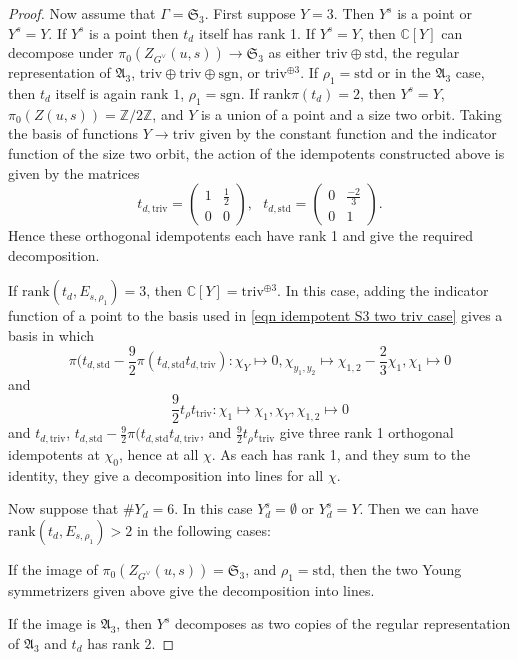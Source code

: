 \documentclass[10pt]{article}
\newcommand{\Z}{\mathbb{Z}}
\newcommand{\C}{\mathbb{C}}
\newcommand{\Sn}{\mathfrak{S}}
\newcommand{\An}{\mathfrak{A}}
\newcommand{\triv}{\mathrm{triv}}
\newcommand{\sgn}{\mathrm{sgn}}
\theoremstyle{definition}
\theoremstyle{remark}
\newcommand{\std}{\mathrm{std}}
\begin{document}
\begin{proof}
Now assume that $\Gamma=\Sn_3$.
First suppose $Y=3$. Then $Y^s$ is a point or $Y^s=Y$. 
If $Y^s$ is a point then $t_d$ itself has rank 1. If $Y^s=Y$, then $\C[Y]$ can decompose under $\pi_0(Z_{G^\vee}(u,s))\to\Sn_3$ as either $\triv\oplus\std$, the regular representation of $\An_3$, $\triv\oplus\triv\oplus\sgn$, or $\triv^{\oplus 3}$. If $\rho_1=\std$ or in the $\An_3$ case, then $t_d$ itself is again rank $1$, $\rho_1=\sgn$. If $\mathrm{rank}\pi(t_d)=2$, then $Y^s=Y$, $\pi_0(Z(u,s))=\Z/2\Z$, and $Y$ is a union of a point and a size two orbit. Taking the basis of functions $Y\to\triv$ given by the constant function and the indicator function of the size two orbit,  the action of the idempotents constructed above is given by the matrices
%
\begin{equation}
\label{eqn idempotent S3 two triv case}
t_{d,\triv}=\begin{pmatrix}
1&\frac{1}{2}\\
0&0
\end{pmatrix},~~~
t_{d,\std}=\begin{pmatrix}
0&\frac{-2}{3}\\
0&1
\end{pmatrix}.
\end{equation}
%
Hence these orthogonal idempotents each have rank 1 and give the required decomposition.

If $\mathrm{rank}(t_d, E_{s,\rho_1})=3$, then $\C[Y]=\triv^{\oplus 3}$. In this case, adding the indicator function of a point to the basis used in \eqref{eqn idempotent S3 two triv case} gives a basis in which
%
\[
\pi(t_{d,\std}-\frac{9}{2}\pi(t_{d,\std}t_{d,\triv})\colon \chi_Y\mapsto 0, \chi_{y_1,y_2}\mapsto \chi_{1,2}-\frac{2}{3}\chi_1, \chi_1\mapsto 0
\]
and
\[
\frac{9}{2}t_{\rho}t_{\triv}\colon \chi_1\mapsto \chi_1, \chi_Y,\chi_{1,2}\mapsto 0
\]
and $t_{d,\triv}$, $t_{d,\std}-\frac{9}{2}\pi(t_{d,\std}t_{d,\triv}$, and $\frac{9}{2}t_{\rho}t_{\triv}$ give three rank 1 orthogonal idempotents at $\chi_0$, hence at all $\chi$. As each has rank 1, and they sum to the identity, they give a decomposition into lines for all $\chi$.

Now suppose that $\# Y_d=6$. In this case $Y_d^s=\emptyset$ or $Y_d^s=Y$. Then we can have $\mathrm{rank}(t_d, E_{s,\rho_1})>2$ in the following cases: 

If the image of $\pi_0(Z_{G^\vee}(u,s))=\Sn_3$, and $\rho_1=\std$, then the two Young symmetrizers given above give the decomposition into lines.

If the image is $\An_3$, then $Y^s$ decomposes as two copies of the regular representation of $\An_3$ and $t_d$ has rank $2$.


\end{proof}
\end{document}
